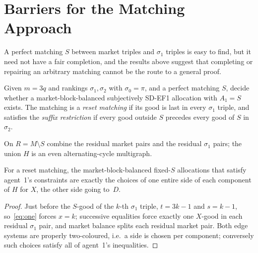 \documentclass[sigconf,anonymous]{aamas}
\begin{document}
\section{Barriers for the Matching Approach}\label{sec:barriers}
A perfect matching $S$ between market triples and $\sigma_1$ triples is easy to find, but it need not have a fair completion, and the results above suggest that completing or repairing an arbitrary matching cannot be the route to a general proof.

\begin{definition}
Given $m=3q$ and rankings $\sigma_1,\sigma_2$ with $\sigma_0=\pi$, and a perfect matching $S$, decide whether a market-block-balanced subjectively SD-EF1 allocation with $A_1=S$ exists. The matching is a \emph{reset matching} if its good is last in every $\sigma_1$ triple, and satisfies the \emph{suffix restriction} if every good outside $S$ precedes every good of $S$ in $\sigma_2$.
\end{definition}

On $R=M\setminus S$ combine the residual market pairs and the residual $\sigma_1$ pairs; the union $H$ is an even alternating-cycle multigraph.
\begin{lemma}\label{lem:reset}
For a reset matching, the market-block-balanced fixed-$S$ allocations that satisfy agent~1's constraints are exactly the choices of one entire side of each component of $H$ for $X$, the other side going to~$D$.
\end{lemma}
\begin{proof}
Just before the $S$-good of the $k$-th $\sigma_1$ triple, $t=3k-1$ and $s=k-1$, so~\eqref{eq:one} forces $x=k$; successive equalities force exactly one $X$-good in each residual $\sigma_1$ pair, and market balance splits each residual market pair. Both edge systems are properly two-coloured, i.e.\ a side is chosen per component; conversely such choices satisfy all of agent~1's inequalities.
\end{proof}
\end{document}
